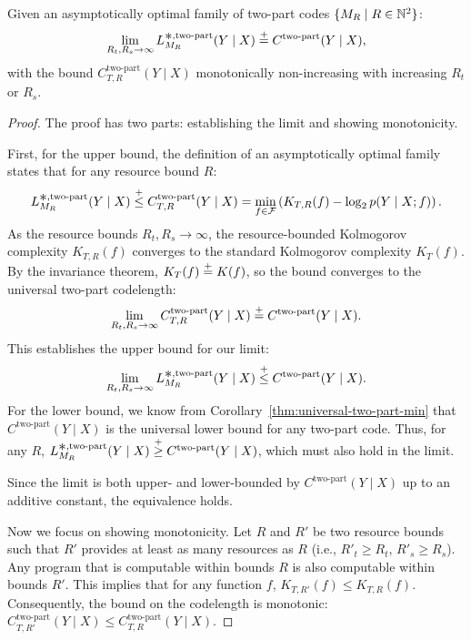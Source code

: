 \begin{prop*} Given an asymptotically optimal family of two-part codes $\{ M_R \mid R \in {\mathbb{N}^2} \}$:
\begin{equation}
    \lim_{R_t,R_s \rightarrow \infty} L^{\bigast,\text{two-part}}_{M_R}(Y \mid X) \eqc C^{\text{two-part}}(Y \mid X),
\end{equation}
with the bound $C^{\text{two-part}}_{T,R}(Y \mid X)$ monotonically non-increasing with increasing $R_t$ or $R_s$.
\end{prop*}

\begin{proof}
The proof has two parts: establishing the limit and showing monotonicity.

First, for the upper bound, the definition of an asymptotically optimal family states that for any resource bound $R$:
\begin{equation}
L^{\bigast,\text{two-part}}_{M_R}(Y \mid X) \leqc C^{\text{two-part}}_{T,R}(Y \mid X) = \min_{f \in \gF} \left( K_{T,R}(f) -\log_2 p(Y \mid X;f) \right). \end{equation}
As the resource bounds $R_t, R_s \to \infty$, the resource-bounded Kolmogorov complexity $K_{T,R}(f)$ converges to the standard Kolmogorov complexity $K_T(f)$. By the invariance theorem, $K_T(f) \stackrel{+}{=} K(f)$, so the bound converges to the universal two-part codelength:
\begin{equation}
\lim_{R_t, R_s \to \infty} C^{\text{two-part}}_{T,R}(Y \mid X) \stackrel{+}{=} C^{\text{two-part}}(Y \mid X).
\end{equation}
This establishes the upper bound for our limit:
\begin{equation}
\lim_{R_t, R_s \to \infty} L^{\bigast,\text{two-part}}_{M_R}(Y \mid X) \leqc C^{\text{two-part}}(Y \mid X).
\end{equation}
For the lower bound, we know from Corollary~\ref{thm:universal-two-part-min} that $C^{\text{two-part}}(Y \mid X)$ is the universal lower bound for any two-part code. Thus, for any $R$, $L^{\bigast,\text{two-part}}_{M_R}(Y \mid X) \geqc C^{\text{two-part}}(Y \mid X)$, which must also hold in the limit.

Since the limit is both upper- and lower-bounded by $C^{\text{two-part}}(Y \mid X)$ up to an additive constant, the equivalence holds.

Now we focus on showing monotonicity.
Let $R$ and $R'$ be two resource bounds such that $R'$ provides at least as many resources as $R$ (i.e., $R'_t \ge R_t$, $R'_s \ge R_s$). Any program that is computable within bounds $R$ is also computable within bounds $R'$. This implies that for any function $f$, $K_{T,R'}(f) \le K_{T,R}(f)$. Consequently, the bound on the codelength is monotonic: $C^{\text{two-part}}_{T,R'}(Y \mid X) \le C^{\text{two-part}}_{T,R}(Y \mid X)$.
\end{proof}


